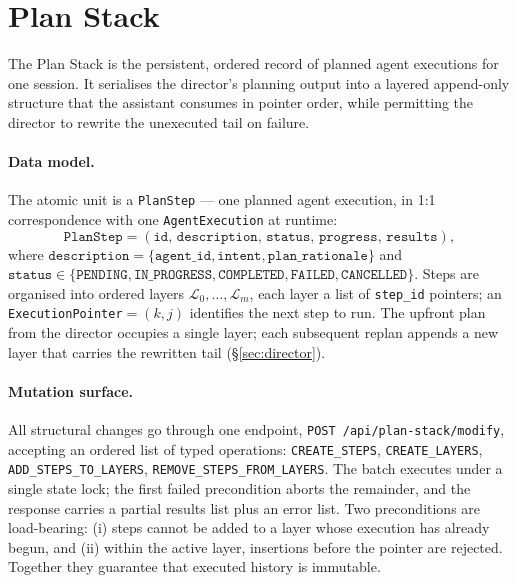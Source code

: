 \section{Plan Stack}
\label{sec:plan-stack}

The Plan Stack is the persistent, ordered record of planned agent
executions for one session. It serialises the director's planning output
into a layered append-only structure that the assistant consumes in
pointer order, while permitting the director to rewrite the unexecuted
tail on failure.

\paragraph{Data model.}
The atomic unit is a \texttt{PlanStep} — one planned agent execution,
in 1:1 correspondence with one \texttt{AgentExecution} at runtime:
\begin{equation*}
\texttt{PlanStep}=(\texttt{id},\,\texttt{description},\,\texttt{status},\,\texttt{progress},\,\texttt{results}),
\end{equation*}
where $\texttt{description}\!=\!\{\texttt{agent\_id},\texttt{intent},\texttt{plan\_rationale}\}$
and $\texttt{status}\!\in\!\{\texttt{PENDING},\texttt{IN\_PROGRESS},\texttt{COMPLETED},\texttt{FAILED},\texttt{CANCELLED}\}$.
Steps are organised into ordered layers
$\mathcal{L}_0,\dots,\mathcal{L}_m$, each layer a list of
\texttt{step\_id} pointers; an \texttt{ExecutionPointer}$=(k,j)$
identifies the next step to run. The upfront plan from the director
occupies a single layer; each subsequent replan appends a new layer
that carries the rewritten tail (\S\ref{sec:director}).

\paragraph{Mutation surface.}
All structural changes go through one endpoint,
\texttt{POST /api/plan-stack/modify}, accepting an ordered list of
typed operations:
\texttt{CREATE\_STEPS}, \texttt{CREATE\_LAYERS},
\texttt{ADD\_STEPS\_TO\_LAYERS}, \texttt{REMOVE\_STEPS\_FROM\_LAYERS}.
The batch executes under a single state lock; the first failed
precondition aborts the remainder, and the response carries a partial
results list plus an error list. Two preconditions are load-bearing:
(i) steps cannot be added to a layer whose execution has already begun,
and (ii) within the active layer, insertions before the pointer are
rejected. Together they guarantee that executed history is immutable.


